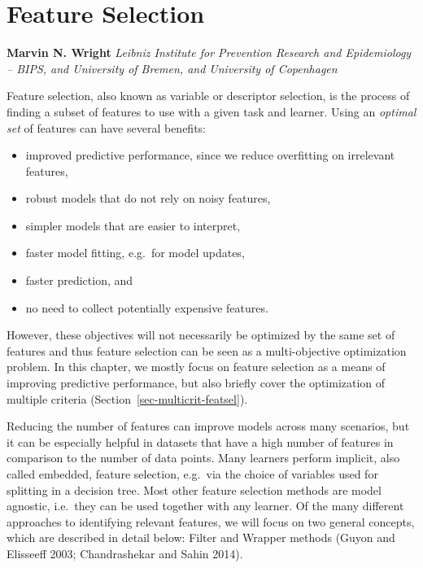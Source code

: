 \hypertarget{sec-feature-selection}{%
\chapter{Feature Selection}\label{sec-feature-selection}}

\vspace{-15mm}

\textbf{Marvin N. Wright} \newline  \emph{Leibniz Institute for
Prevention Research and Epidemiology -- BIPS, and University of Bremen,
and University of Copenhagen} \newline \newline 

Feature selection, also known as variable or
descriptor
selection,
is the process of finding a subset of features to use with a given task
and learner. Using an \emph{optimal set} of features can have several
benefits:

\begin{itemize}
\tightlist
\item
  improved predictive performance, since we reduce overfitting on
  irrelevant features,
\item
  robust models that do not rely on noisy features,
\item
  simpler models that are easier to interpret,
\item
  faster model fitting, e.g.~for model updates,
\item
  faster prediction, and
\item
  no need to collect potentially expensive features.
\end{itemize}

However, these objectives will not necessarily be optimized by the same
set of features and thus feature selection can be seen as a
multi-objective optimization
problem. In this chapter, we mostly focus on feature selection as a
means of improving predictive performance, but also briefly cover the
optimization of multiple criteria (Section~\ref{sec-multicrit-featsel}).

Reducing the number of features can improve models across many
scenarios, but it can be especially helpful in datasets that have a high
number of features in comparison to the number of data points. Many
learners perform implicit, also called embedded, feature
selection,
e.g.~via the choice of variables used for splitting in a decision tree.
Most other feature selection methods are model agnostic, i.e.~they can
be used together with any learner. Of the many different approaches to
identifying relevant features, we will focus on two general concepts,
which are described in detail below: Filter and Wrapper methods (Guyon
and Elisseeff 2003; Chandrashekar and Sahin 2014).


